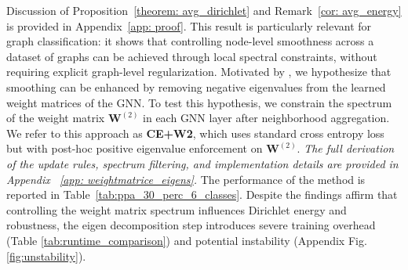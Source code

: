 Discussion of Proposition~\ref{theorem: avg_dirichlet} and Remark~\ref{cor: avg_energy} is provided in Appendix~\ref{app: proof}. This result is particularly relevant for graph classification: it shows that controlling node-level smoothness across a dataset of graphs can be achieved through local spectral constraints, without requiring explicit graph-level regularization. Motivated by \cite{GRAFF}, we hypothesize that smoothing can be enhanced by removing negative eigenvalues from the learned weight matrices of the GNN. To test this hypothesis, we constrain the spectrum of the weight matrix \( \mathbf{W}^{(2)} \) in each GNN layer after neighborhood aggregation.
We refer to this approach as \textbf{CE+W2}, which uses standard cross entropy loss but with post-hoc positive eigenvalue enforcement on \( \mathbf{W}^{(2)} \).
\textit{The full derivation of the update rules, spectrum filtering, and implementation details are provided in Appendix~ \ref{app: weightmatrice_eigens}.} 
The performance of the method is reported in Table~\ref{tab:ppa_30_perc_6_classes}. 
Despite the findings affirm that controlling the weight matrix spectrum influences
Dirichlet energy and robustness, the eigen decomposition step introduces severe training overhead (Table \ref{tab:runtime_comparison}) and potential instability (Appendix Fig. \ref{fig:unstability}).














